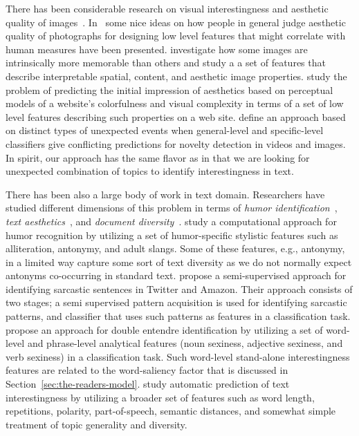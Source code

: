 There has been considerable research on visual interestingness and aesthetic quality of images~\cite{Datta:2006:SAP:2129560.2129588,Datta:2008:4233023,Ke:2006:DHF:1153170.1153495,IsolaParikhTorralbaOliva2011,dhar:2011,reinecke2013predicting,journals/pami/WeinshallZHKOABGNPHP12,journals/pami/WeinshallZHKOABGNPHP12}. In~\cite{Datta:2006:SAP:2129560.2129588,Datta:2008:4233023,Ke:2006:DHF:1153170.1153495,dhar:2011} some nice ideas on how people in general judge aesthetic quality of photographs for designing low level features that might correlate with human measures have been presented. \citep{IsolaParikhTorralbaOliva2011} investigate how some images are intrinsically more memorable than others and study a a set of features that describe interpretable spatial, content, and aesthetic image properties. \citep{reinecke2013predicting,journals/pami/WeinshallZHKOABGNPHP12}  study the problem of predicting the initial impression of aesthetics
based on perceptual models of a website's colorfulness and visual complexity in terms of a set of low level features describing such properties on a web site.  
\citep{journals/pami/WeinshallZHKOABGNPHP12} define an approach based on distinct types of unexpected events when general-level and specific-level classifiers give conflicting predictions for novelty detection in videos and images. In spirit, our approach has the same flavor as \cite{journals/pami/WeinshallZHKOABGNPHP12}  in that we are looking for unexpected combination of topics to identify interestingness in text.

 
There has been also a large body of work in text domain. Researchers have studied different dimensions of this problem in terms of {\em humor identification}~\cite{Mihalcea:2005:MCL:1220575.1220642,Davidov:2010:SRS:1870568.1870582,Kiddon11,labutov-lipson:2012:ACL2012short},
{\em text aesthetics}~\cite{journals:tamd:Schmidhuber10,N13-1118,ganguly:2014}, and {\em document diversity}~\cite{bache:2013}.  \citep{Mihalcea:2005:MCL:1220575.1220642} study a computational approach for humor recognition by utilizing a set of humor-specific stylistic features such as alliteration, antonymy, and adult slangs. Some of these features, e.g., antonymy, in a limited way capture some sort of text diversity as we do not normally expect antonyms co-occurring in standard text. \citep{Davidov:2010:SRS:1870568.1870582}  propose a semi-supervised approach for identifying sarcastic sentences
in Twitter and Amazon.  Their approach consists of two stages; a semi supervised pattern acquisition is used for identifying
sarcastic patterns, and classifier that uses such patterns as features in a classification task. \citep{Kiddon11} propose an approach for double entendre identification by utilizing  a set of word-level and phrase-level analytical features (noun sexiness, adjective sexiness, and verb sexiness) in a classification task. Such word-level stand-alone interestingness features are related to the word-saliency factor that is discussed in Section~\ref{sec:the-readers-model}. \citep{ganguly:2014} study automatic prediction of text interestingness by utilizing a broader set of features such as word length, repetitions, polarity, part-of-speech, semantic distances, and somewhat simple treatment of topic generality and diversity.

